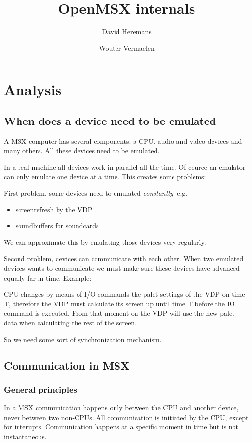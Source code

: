 \documentclass[11pt, a4paper]{report}
\title{OpenMSX internals}
\author{David Heremans}
\author{Wouter Vermaelen}
\begin{document}
\maketitle
\tableofcontents

\chapter{Analysis}

\section{When does a device need to be emulated}

A MSX computer has several components: a CPU, audio and video devices and
many others. All these devices need to be emulated.

In a real machine all devices work in parallel all the time. Of cource an
emulator can only emulate one device at a time. This creates some problems:

First problem, some devices need to emulated \textit{constantly}, e.g.
\begin{itemize}
\item screenrefresh by the VDP
\item soundbuffers for soundcards
\end{itemize}
We can approximate this by emulating those devices very regularly.

Second problem, devices can communicate with each other. When two emulated
devices wants to communicate we must make sure these devices have advanced
equally far in time. Example:

CPU changes by means of I/O-commands the palet settings of the VDP on
time T, therefore the VDP must calculate its screen up until time T before
the IO command is executed. From that moment on the VDP will use the new
palet data when calculating the rest of the screen.

So we need some sort of synchronization mechanism.


\section{Communication in MSX}

\subsection{General principles}

In a MSX communication happens only between the CPU and another device, never
between two non-CPUs. All communication is initiated by the CPU, except for
interupts. Communication happens at a specific moment in time but is not 
instantaneous.
\end{document}
